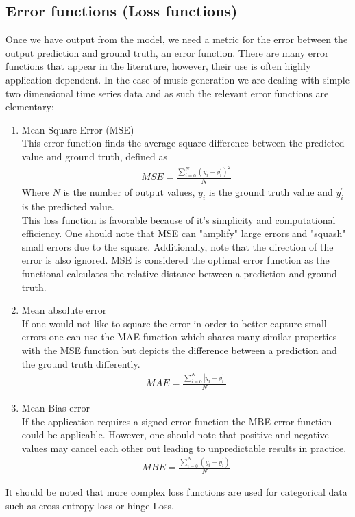 \documentclass{article}
\begin{document}
\subsection{Error functions (Loss functions)}
\label{sec:error}
Once we have output from the model, we need a metric for the error between the output prediction and ground truth, an error function. There are many error functions that appear in the literature, however, their use is often highly application dependent. In the case of music generation we are dealing with simple two dimensional time series data and as such the relevant error functions are elementary:
\begin{enumerate}
\item Mean Square Error (MSE)\\
This error function finds the average square difference between the predicted value and ground truth, defined as
\begin{align*}
MSE = \frac{\sum_{i=0}^N (y_i - y_i^\prime)^2}{N}
\end{align*}
Where $N$ is the number of output values, $y_i$ is the ground truth value and $y_i^\prime$ is the predicted value. \\
This loss function is favorable because of it's simplicity and computational efficiency. One should note that MSE can "amplify" large errors and "squash" small errors due to the square. Additionally, note that the direction of the error is also ignored.  MSE is considered the optimal error function as the functional calculates the relative distance between a prediction and ground truth. 
\item Mean absolute error \\
If one would not like to square the error in order to better capture small errors one can use the MAE function which shares many similar properties with the MSE function but depicts the difference between a prediction and the ground truth differently. 
\begin{align*}
MAE = \frac{\sum_{i=0}^N |y_i - y_i^\prime|}{N}
\end{align*}
\item Mean Bias error \\
If the application requires a signed error function the MBE error function could be applicable. However, one should note that positive and negative values may cancel each other out leading to unpredictable results in practice. 
\begin{align*}
MBE = \frac{\sum_{i=0}^N (y_i - y_i^\prime)}{N}
\end{align*}
\end{enumerate}
It should be noted that more complex loss functions are used for categorical data such as cross entropy loss or hinge Loss.
\end{document}
